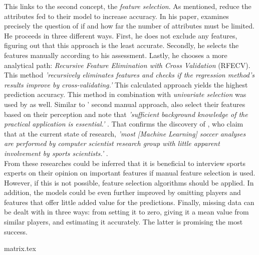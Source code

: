 \indent This links to the second concept, the \emph{feature selection}. As mentioned, \citet{deng_analysis_2020,egidi_bayesian_2018} reduce the attributes fed to their model to increase accuracy. In his paper, \citet{lutz_fantasy_2015} examines precisely the question of if and how far the number of attributes must be limited. He proceeds in three different ways. First, he does not exclude any features, figuring out that this approach is the least accurate. Secondly, he selects the features manually according to his assessment. Lastly, he chooses a more analytical path: \emph{Recursive Feature Elimination with Cross Validation} (RFECV). This method \emph{'recursively eliminates features and checks if the regression method's results improve by cross-validating.'} \parencite[, p. 4]{lutz_fantasy_2015} This calculated approach yields the highest prediction accuracy. This method in combination with \emph{univariate selection} was used by \citet{anik_players_2018} as well. Similar to \citeauthor{lutz_fantasy_2015}' second manual approach, \citeauthor{deng_analysis_2020} also select their features based on their perception and note that \emph{'sufficient background knowledge of the practical application is essential.'} \parencite[, p. 4]{deng_analysis_2020}. That confirms the discovery of \citeauthor{rein_big_2016}, who claim that at the current state of research, \emph{'most [Machine Learning] soccer analyses are performed by computer scientist research group with little apparent involvement by sports scientists.'} \parencite[, p. 6]{rein_big_2016}. \\
\indent From these researches could be inferred that it is beneficial to interview sports experts on their opinion on important features if manual feature selection is used. However, if this is not possible, feature selection algorithms should be applied. In addition, the models could be even further improved by omitting players and features that offer little added value for the predictions. Finally, missing data can be dealt with in three ways: from setting it to zero, giving it a mean value from similar players, and estimating it accurately. The latter is promising the most success.




{matrix.tex}


